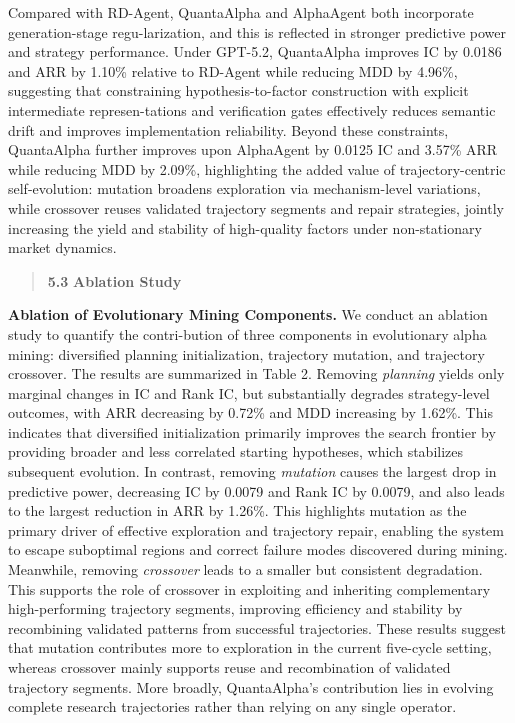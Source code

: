 \documentclass[
]{article}
\begin{document}
Compared with RD-Agent, QuantaAlpha and AlphaAgent both incorporate
generation-stage regu-larization, and this is reflected in stronger
predictive power and strategy performance. Under GPT-5.2, QuantaAlpha
improves IC by 0.0186 and ARR by 1.10\% relative to RD-Agent while
reducing MDD by 4.96\%, suggesting that constraining
hypothesis-to-factor construction with explicit intermediate
represen-tations and verification gates effectively reduces semantic
drift and improves implementation reliability. Beyond these constraints,
QuantaAlpha further improves upon AlphaAgent by 0.0125 IC and 3.57\% ARR
while reducing MDD by 2.09\%, highlighting the added value of
trajectory-centric self-evolution: mutation broadens exploration via
mechanism-level variations, while crossover reuses validated trajectory
segments and repair strategies, jointly increasing the yield and
stability of high-quality factors under non-stationary market dynamics.

\begin{quote}
\textbf{5.3} \textbf{Ablation Study}
\end{quote}

\textbf{Ablation of Evolutionary Mining Components.} We conduct an
ablation study to quantify the contri-bution of three components in
evolutionary alpha mining: diversified planning initialization,
trajectory mutation, and trajectory crossover. The results are
summarized in Table 2. Removing \emph{planning} yields only marginal
changes in IC and Rank IC, but substantially degrades strategy-level
outcomes, with ARR decreasing by 0.72\% and MDD increasing by 1.62\%.
This indicates that diversified initialization primarily improves the
search frontier by providing broader and less correlated starting
hypotheses, which stabilizes subsequent evolution. In contrast, removing
\emph{mutation} causes the largest drop in predictive power, decreasing
IC by 0.0079 and Rank IC by 0.0079, and also leads to the largest
reduction in ARR by 1.26\%. This highlights mutation as the primary
driver of effective exploration and trajectory repair, enabling the
system to escape suboptimal regions and correct failure modes discovered
during mining. Meanwhile, removing \emph{crossover} leads to a smaller
but consistent degradation. This supports the role of crossover in
exploiting and inheriting complementary high-performing trajectory
segments, improving efficiency and stability by recombining validated
patterns from successful trajectories. These results suggest that
mutation contributes more to exploration in the current five-cycle
setting, whereas crossover mainly supports reuse and recombination of
validated trajectory segments. More broadly, QuantaAlpha's contribution
lies in evolving complete research trajectories rather than relying on
any single operator.
\end{document}
